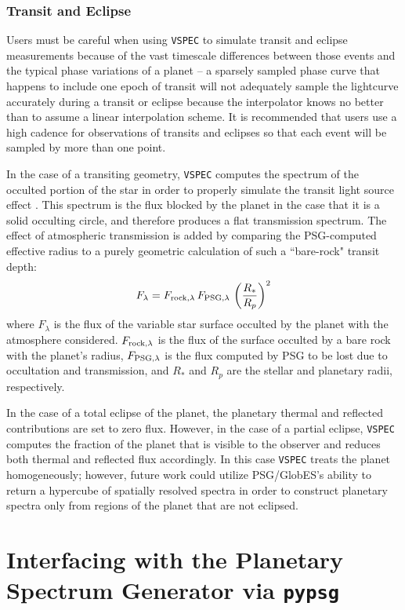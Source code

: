 \documentclass[twocolumn]{aastex631}
\newcommand{\vspec}[1]{\texttt{VSPEC}#1}
\begin{document}
\subsubsection{Transit and Eclipse}
Users must be careful when using \vspec{} to simulate transit and eclipse measurements because of the vast timescale differences between those events
and the typical phase variations of a planet -- a sparsely sampled phase curve that happens to include one epoch of transit will not adequately sample the lightcurve accurately during a transit or eclipse because the interpolator knows no better than to assume a linear interpolation scheme. It is recommended that users use a high cadence for observations of transits and eclipses so that each event will be sampled by more than one point.

In the case of a transiting geometry, \vspec{} computes the spectrum of the occulted portion of the star in order to properly simulate the
transit light source effect \citep[TLS][]{rackham2018}. This spectrum is the flux blocked by the planet in the case that it is a solid occulting circle, and therefore produces a flat transmission spectrum. The effect of atmospheric transmission is added by comparing the PSG-computed effective radius to a purely geometric calculation of such a ``bare-rock" transit depth:
\begin{equation}
    F_{\lambda} = F_{{\rm rock}, \lambda}\, F_{{\rm PSG,} \lambda} \,\left (\frac{R_*}{R_p} \right )^2
\end{equation}
where $F_\lambda$ is the flux of the variable star surface occulted by the planet with the atmosphere considered. $F_{{\rm rock}, \lambda}$ is the
flux of the surface occulted by a bare rock with the planet's radius, $F_{{\rm PSG,} \lambda}$ is the flux computed by PSG to be lost
due to occultation and transmission, and $R_*$ and $R_p$ are the stellar and planetary radii, respectively.

In the case of a total eclipse of the planet, the planetary thermal and reflected contributions are set to zero flux. However, in the case of a partial eclipse,
\vspec{} computes the fraction of the planet that is visible to the observer and reduces both thermal and reflected flux accordingly. In this case
\vspec{} treats the planet homogeneously; however, future work could utilize PSG/GlobES's ability to return a hypercube of spatially resolved
spectra in order to construct planetary spectra only from regions of the planet that are not eclipsed.

\section{Interfacing with the Planetary Spectrum Generator via \texttt{pypsg}}
\label{sec:pypsg}
\end{document}
